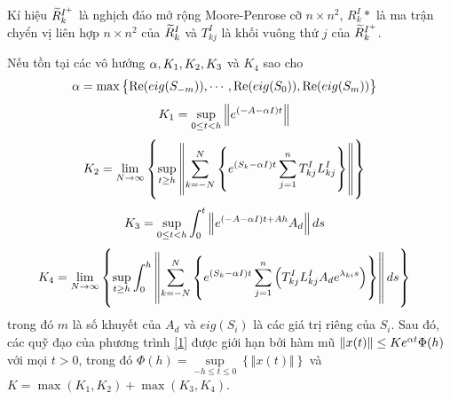 % 
Kí hiệu $\widetilde{R}_k^{I^+}$ là nghịch đảo mở rộng Moore-Penrose cỡ $n \times n^2$, $R^I_k*$ là ma trận chyển vị liên hợp $n \times n^2$ của $\widetilde{R}^I_k$ và $T_{kj}^I$ là khối vuông thứ $j$ của $\widetilde{R}_k^{I^+}$.\\
%
\begin{dly}\label{dly1}
Nếu tồn tại các vô hướng $\alpha, K_1, K_2, K_3$ và $K_4$ sao cho
\begin{align}\label{17}
	&\alpha = \max \left\{\mathrm{Re}(eig(S_{-m})), \cdots, \mathrm{Re}(eig(S_{0})), \mathrm{Re}(eig(S_{m})) \right\}
\end{align}
\begin{align}\label{18}
	&K_1 = \sup\limits_{0 \le t <h} \left \Vert e^{(-A - \alpha I)t} \right\Vert
\end{align}
\begin{align}\label{19}
	&K_2 = \lim\limits_{N \to \infty} \left\{ \sup\limits_{t \ge h} \left\Vert \sum_{k=-N}^{N} \left\{e^{(S_k-\alpha I)t} \sum_{j=1}^{n} T^I_{kj}L^I_{kj}\right\} \right\Vert\right\}
\end{align}	
\begin{align}\label{20}
	&K_3 = \sup \limits_{0 \le t <h} \int_0^t \left\Vert e^{(-A-\alpha I)t +A h }A_d \right\Vert ds  
\end{align}
\begin{align}\label{21}
	&K_4 = \lim\limits_{N \to \infty} \left\{\sup\limits_{t \ge h} \int_{0}^{h} \left \Vert \sum_{k=-N}^{N} \left\{e^{(S_k-\alpha I)t} \sum_{j =1}^{n} \left(T^I_{kj}L^I_{kj}A_de^{\lambda_{ki}s } \right) \right\} \right \Vert ds \right\}
\end{align}
%
trong đó $m$ là số khuyết của $A_d$ và $eig(S_i)$ là các giá trị riêng của $S_i$. Sau đó, các quỹ đạo của phương trình \ref{1} được giới hạn bởi hàm mũ $\Vert x(t) \Vert \le Ke^{\alpha t}\Phi(h)$ với mọi $t >0$, trong đó $\Phi(h) = \sup\limits_{-h \le t \le 0} \left\{\Vert x(t) \Vert \right\} $ và $K = \max (K_1, K_2) + \max(K_3, K_4)$.
\end{dly}

